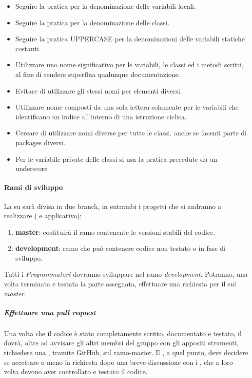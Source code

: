 \begin{itemize}
\item Seguire la pratica  per la denominazione delle variabili locali.
\item Seguire la pratica  per la denominazione delle classi.
\item Seguire la pratica UPPER\textunderscore CASE per la denominazioni delle variabili statiche costanti.
\item Utilizzare uno nome significativo per le variabili, le classi ed i metodi scritti, al fine di rendere superflua qualunque documentazione.
\item Evitare di utilizzare gli stessi nomi per elementi diversi.
\item Utilizzare nome composti da una sola lettera solamente per le variabili che identificano un indice all'interno di una istruzione ciclica.
\item Cercare di utilizzare nomi diverse per tutte le classi, anche se facenti parte di packages diversi.
\item Per le variabile private delle classi si usa la pratica  precedute da un underscore 
\end{itemize}

\paragraph{Rami di sviluppo}

La  su  sarà divisa in due branch, in entrambi i progetti che si andranno a realizzare ( e applicativo):
\begin{enumerate}
\item \textbf{master}: costituirà il ramo contenente le versioni stabili del codice.
\item \textbf{development}: ramo che può contenere codice non testato o in fase di sviluppo.
\end{enumerate}


Tutti i \textit{Programmatori} dovranno sviluppare nel ramo \textit{development}. Potranno, una volta terminata e testata la parte assegnata, effettuare una richiesta per il  sul \textit{master}.

\subparagraph{Effettuare una pull request}

Una volta che il codice è stato completamente scritto, documentato e testato, il \Prog{} dovrà, oltre ad avvisare gli altri membri del gruppo con gli appositi strumenti, richiedere una , tramite GitHub, sul ramo-master. Il \Pm{}, a quel punto, deve decidere se accettare o meno la richiesta dopo una breve discussione con i \VerP{}, che a loro volta devono aver controllato e testato il codice.

